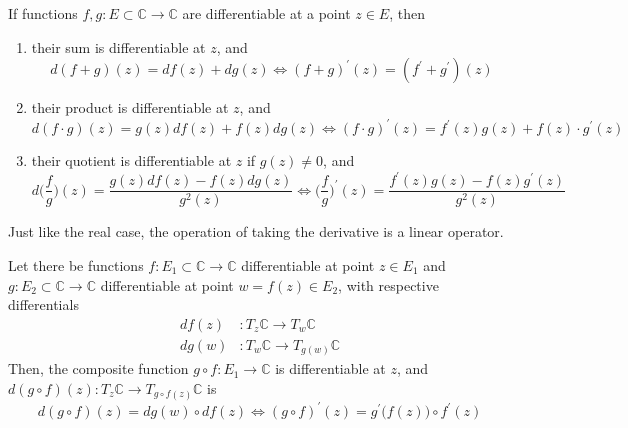     \begin{lemma}
      \label{thm:arithmetic-properties-of-differentiation-over-c}
      If functions $f, g: E \subset \mathbb{C} \to \mathbb{C}$ are differentiable at a point $z \in E$, then 
      \begin{enumerate}
        \item their sum is differentiable at $z$, and 
        \begin{equation}
          d(f + g)(z) = df(z) + dg(z) \iff (f + g)^\prime (z) = (f^\prime + g^\prime)(z)
        \end{equation}
        \item their product is differentiable at $z$, and 
        \begin{equation}
          d(f \cdot g) (z) = g(z) df(z) + f(z) dg(z) \iff (f \cdot g)^\prime (z) = f^\prime (z) g(z) + f(z) \cdot g^\prime (z)
        \end{equation}
        \item their quotient is differentiable at $z$ if $g(z) \neq 0$, and 
        \begin{equation}
          d \bigg( \frac{f}{g}\bigg) (z) = \frac{g(z) df(z) - f(z) dg(z)}{g^2 (z)} \iff \bigg(\frac{f}{g}\bigg)^\prime (z) = \frac{f^\prime (z) g(z) - f(z) g^\prime (z)}{g^2 (z)}
        \end{equation}
      \end{enumerate}
      Just like the real case, the operation of taking the derivative is a linear operator. 
    \end{lemma}

    \begin{lemma}
      \label{thm:chain-rule-for-composite-functions-over-c}
      Let there be functions $f: E_1 \subset \mathbb{C} \to \mathbb{C}$ differentiable at point $z \in E_1$ and $g: E_2 \subset \mathbb{C} \to \mathbb{C}$ differentiable at point $w = f(z) \in E_2$, with respective differentials 
      \begin{align*}
          df(z) & : T_z \mathbb{C} \to T_w \mathbb{C} \\
          dg(w) & : T_w \mathbb{C} \to T_{g(w)} \mathbb{C}
      \end{align*}
      Then, the composite function $g \circ f: E_1 \to \mathbb{C}$ is differentiable at $z$, and $d(g \circ f)(z): T_z \mathbb{C} \to T_{g \circ f(z)} \mathbb{C}$ is
      \begin{equation}
        d(g \circ f) (z) = dg(w) \circ df(z) \iff (g \circ f)^\prime (z) = g^\prime \big(f(z)\big) \circ f^\prime (z)
      \end{equation}
    \end{lemma}

